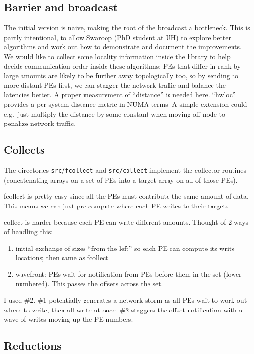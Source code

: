 \documentclass[english]{article}
\begin{document}
\subsection{Barrier and broadcast}

The initial version is naive, making the root of the broadcast a
bottleneck.  This is partly intentional, to allow Swaroop (PhD student
at UH) to explore better algorithms and work out how to demonstrate
and document the improvements. We would like to collect some locality
information inside the library to help decide communication order
inside these algorithms: PEs that differ in rank by large amounts are
likely to be further away topologically too, so by sending to more
distant PEs first, we can stagger the network traffic and balance the
latencies better. A proper measurement of ``distance'' is needed
here. ``hwloc'' provides a per-system distance metric in NUMA
terms. A simple extension could e.g.\ just multiply the distance
by some constant when moving off-node to penalize network traffic.

\subsection{Collects}

The directories \texttt{src/fcollect} and \texttt{src/collect}
implement the collector routines (concatenating arrays on a set of PEs
into a target array on all of those PEs).

fcollect is pretty easy since all the PEs must contribute the same
amount of data. This means we can just pre-compute where each PE
writes to their targets.

collect is harder because each PE can write different amounts. Thought
of 2 ways of handling this:
\begin{enumerate}
\item initial exchange of sizes ``from the left'' so each PE can
compute its write locations; then same as fcollect
\item wavefront: PEs wait for notification from PEs before them in the
set (lower numbered). This passes the offsets across the set.
\end{enumerate}
I used \#2. \#1 potentially generates a network storm as all PEs wait
to work out where to write, then all write at once. \#2 staggers the
offset notification with a wave of writes moving up the PE numbers.

\subsection{Reductions}
\end{document}
